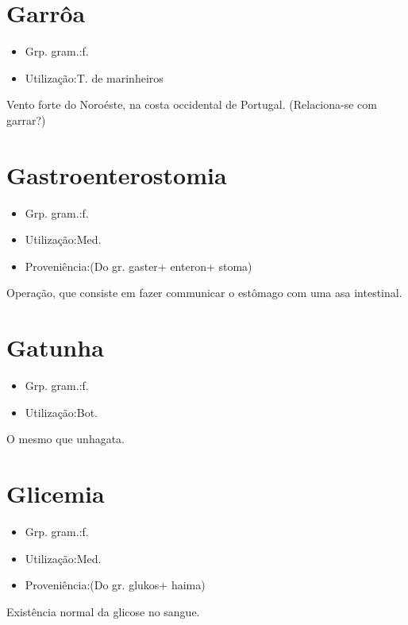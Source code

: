 \section{Garrôa}
\begin{itemize}
\item {Grp. gram.:f.}
\end{itemize}
\begin{itemize}
\item {Utilização:T. de marinheiros}
\end{itemize}
Vento forte do Noroéste, na costa occidental de Portugal.
(Relaciona-se com \textunderscore garrar\textunderscore ?)
\section{Gastroenterostomia}
\begin{itemize}
\item {Grp. gram.:f.}
\end{itemize}
\begin{itemize}
\item {Utilização:Med.}
\end{itemize}
\begin{itemize}
\item {Proveniência:(Do gr. \textunderscore gaster\textunderscore  + \textunderscore enteron\textunderscore  + \textunderscore stoma\textunderscore )}
\end{itemize}
Operação, que consiste em fazer communicar o estômago com uma asa intestinal.
\section{Gatunha}
\begin{itemize}
\item {Grp. gram.:f.}
\end{itemize}
\begin{itemize}
\item {Utilização:Bot.}
\end{itemize}
O mesmo que \textunderscore unhagata\textunderscore .
\section{Glicemia}
\begin{itemize}
\item {Grp. gram.:f.}
\end{itemize}
\begin{itemize}
\item {Utilização:Med.}
\end{itemize}
\begin{itemize}
\item {Proveniência:(Do gr. \textunderscore glukos\textunderscore  + \textunderscore haima\textunderscore )}
\end{itemize}
Existência normal da glicose no sangue.

